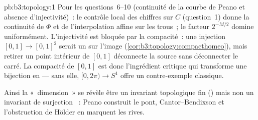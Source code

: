 \begin{solution}{pb:b3:topology:1}
Pour les questions~6--10 (continuité de la courbe de Peano et
absence d'injectivité)~: le contrôle local des chiffres sur
$C$ (question~1) donne la continuité de $\Phi$ et de
l'interpolation affine sur les trous~; le facteur $2^{-M/2}$
domine uniformément. L'injectivité est bloquée par la
compacité~: une injection  $[0,1] \to [0,1]^2$ serait
un  sur l'image
(\cref{cor:b3:topology:compacthomeo}), mais retirer un point
intérieur de $[0,1]$ déconnecte la source sans déconnecter
le carré. La compacité de $[0,1]$ est donc l'ingrédient
critique qui transforme une bijection  en
 --- sans elle, $[0, 2\pi) \to S^1$ offre un
contre-exemple classique.


Ainsi la «~dimension~» se révèle être un invariant topologique
fin () mais non un invariant de surjection
~: Peano construit le pont, Cantor--Bendixson et
l'obstruction de Hölder en marquent les rives.

\end{solution}

